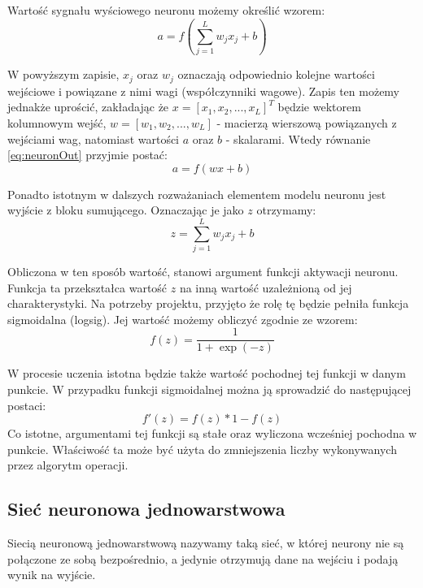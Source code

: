 \documentclass[12pt,twoside]{article}
\begin{document}
Wartość sygnału wyściowego neuronu możemy określić wzorem:
\begin{equation}
	\label{eq:neuronOut}
	a = f\left(\sum\limits_{j=1}^{L}w_{j}x_{j} + b\right)
\end{equation}

W powyższym zapisie, $x_j$ oraz $w_j$ oznaczają odpowiednio kolejne wartości wejściowe i powiązane z nimi wagi (współczynniki wagowe).
Zapis ten możemy jednakże uprościć, zakładając że $x = \left[ x_1, x_2, ..., x_L\right]^T$ będzie wektorem kolumnowym wejść, $w = \left[ w_1, w_2, ..., w_L\right]$ - macierzą wierszową powiązanych z wejściami wag, natomiast wartości $a$ oraz $b$ - skalarami.
Wtedy równanie \ref{eq:neuronOut} przyjmie postać:
\begin{equation}
	\label{eq:neuronVec}
	a = f\left( w x + b \right)
\end{equation}

Ponadto istotnym w dalszych rozważaniach elementem modelu neuronu jest wyjście z bloku sumującego.
Oznaczając je jako $z$ otrzymamy:
\begin{equation}
	\label{eq:z}
	z = \sum\limits_{j=1}^{L}w_{j}x_{j} + b
\end{equation}

Obliczona w ten sposób wartość, stanowi argument funkcji aktywacji neuronu.
Funkcja ta przekształca wartość $z$ na inną wartość uzależnioną od jej charakterystyki.
Na potrzeby projektu, przyjęto że rolę tę będzie pełniła funkcja sigmoidalna (logsig).
Jej wartość możemy obliczyć zgodnie ze wzorem:
\begin{equation}
	\label{eq:sigmoid}
	f(z) =  \frac{1}{1 +\exp(-z)}
\end{equation}

W procesie uczenia istotna będzie także wartość pochodnej tej funkcji w danym punkcie.
W przypadku funkcji sigmoidalnej można ją sprowadzić do następującej postaci:
\begin{equation}
	\label{eq:sigmoidPrime}
	f'(z) = f(z) * 1-f(z)
\end{equation}
Co istotne, argumentami tej funkcji są stałe oraz wyliczona wcześniej pochodna w punkcie.
Właściwość ta może być użyta do zmniejszenia liczby wykonywanych przez algorytm operacji.


\subsection{Sieć neuronowa jednowarstwowa}
Siecią neuronową jednowarstwową nazywamy taką sieć, w której neurony nie są połączone ze sobą bezpośrednio, a jedynie otrzymują dane na wejściu i podają wynik na wyjście.
\end{document}
